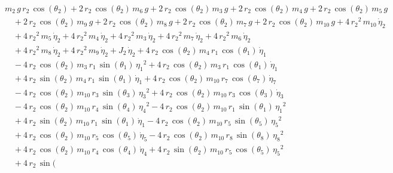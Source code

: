 \begin{eqnarray*} && m_{2}\,g\,r_{2}\,\cos({\theta_{2}}) + 2\,r_{2}\,
\cos({\theta_{2}})\,m_{6}\,g + 2\,r_{2}\,\cos({\theta_{2}})\,m_{3}\,g
 + 2\,r_{2}\,\cos({\theta_{2}})\,m_{4}\,g + 2\,r_{2}\,\cos({\theta_{2}
})\,m_{5}\,g \\ &&\quad\mbox{} + 2\,r_{2}\,\cos({\theta_{2}})\,m_{9}\,
g + 2\,r_{2}\,\cos({\theta_{2}})\,m_{8}\,g + 2\,r_{2}\,\cos({\theta_{2
}})\,m_{7}\,g + 2\,r_{2}\,\cos({\theta_{2}})\,m_{10}\,g + 4\,{r_{2}}^2
\,m_{10}\,{\dot{\eta}_{2}} \\ &&\quad\mbox{} + 4\,{r_{2}}^2\,m_{5}\,{
\dot{\eta}_{2}} + 4\,{r_{2}}^2\,m_{4}\,{\dot{\eta}_{2}} + 4\,{r_{2}}^2
\,m_{3}\,{\dot{\eta}_{2}} + 4\,{r_{2}}^2\,m_{7}\,{\dot{\eta}_{2}} + 4
\,{r_{2}}^2\,m_{6}\,{\dot{\eta}_{2}} \\ &&\quad\mbox{} + 4\,{r_{2}}^2
\,m_{8}\,{\dot{\eta}_{2}} + 4\,{r_{2}}^2\,m_{9}\,{\dot{\eta}_{2}} + J
_{2}\,{\dot{\eta}_{2}} + 4\,r_{2}\,\cos({\theta_{2}})\,m_{4}\,r_{1}\,
\cos({\theta_{1}})\,{\dot{\eta}_{1}} \\ &&\quad\mbox{} - 4\,r_{2}\,
\cos({\theta_{2}})\,m_{3}\,r_{1}\,\sin({\theta_{1}})\,{{\eta_{1}}}^2
 + 4\,r_{2}\,\cos({\theta_{2}})\,m_{3}\,r_{1}\,\cos({\theta_{1}})\,{
\dot{\eta}_{1}} \\ &&\quad\mbox{} + 4\,r_{2}\,\sin({\theta_{2}})\,m_{4
}\,r_{1}\,\sin({\theta_{1}})\,{\dot{\eta}_{1}} + 4\,r_{2}\,\cos({
\theta_{2}})\,m_{10}\,r_{7}\,\cos({\theta_{7}})\,{\dot{\eta}_{7}}
 \\ &&\quad\mbox{} - 4\,r_{2}\,\cos({\theta_{2}})\,m_{10}\,r_{3}\,\sin
({\theta_{3}})\,{{\eta_{3}}}^2 + 4\,r_{2}\,\cos({\theta_{2}})\,m_{10}
\,r_{3}\,\cos({\theta_{3}})\,{\dot{\eta}_{3}} \\ &&\quad\mbox{} - 4\,r
_{2}\,\cos({\theta_{2}})\,m_{10}\,r_{4}\,\sin({\theta_{4}})\,{{\eta_{4
}}}^2 - 4\,r_{2}\,\cos({\theta_{2}})\,m_{10}\,r_{1}\,\sin({\theta_{1}}
)\,{{\eta_{1}}}^2 \\ &&\quad\mbox{} + 4\,r_{2}\,\sin({\theta_{2}})\,m
_{10}\,r_{1}\,\sin({\theta_{1}})\,{\dot{\eta}_{1}} - 4\,r_{2}\,\cos({
\theta_{2}})\,m_{10}\,r_{5}\,\sin({\theta_{5}})\,{{\eta_{5}}}^2
 \\ &&\quad\mbox{} + 4\,r_{2}\,\cos({\theta_{2}})\,m_{10}\,r_{5}\,\cos
({\theta_{5}})\,{\dot{\eta}_{5}} - 4\,r_{2}\,\cos({\theta_{2}})\,m_{10
}\,r_{8}\,\sin({\theta_{8}})\,{{\eta_{8}}}^2 \\ &&\quad\mbox{} + 4\,r
_{2}\,\cos({\theta_{2}})\,m_{10}\,r_{4}\,\cos({\theta_{4}})\,{
\dot{\eta}_{4}} + 4\,r_{2}\,\sin({\theta_{2}})\,m_{10}\,r_{5}\,\cos({
\theta_{5}})\,{{\eta_{5}}}^2 \\ &&\quad\mbox{} + 4\,r_{2}\,\sin({
}
\end{eqnarray*}

